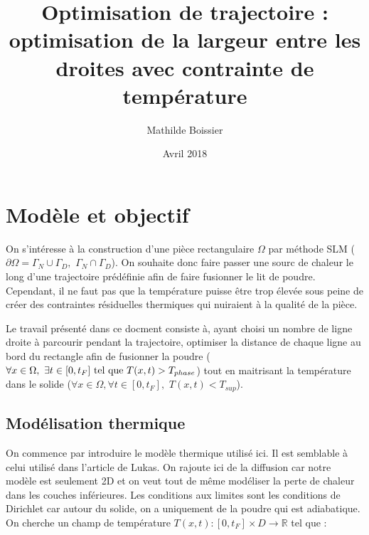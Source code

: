 \documentclass[11pt,a4paper]{article}
\begin{document}
\newcommand{\heavi}{h_{\epsilon}}
\newcommand{\heaviP}{h'_{\epsilon}}
\newcommand{\heaviPP}{h''_{\epsilon}}

\newcommand{\Math}[1]{\textcolor{red}{\textbf{#1}}}

\newcommand{\intO}{\int_{\Omega}}
\newcommand{\bigintO}{\bigint_{\Omega}}
\newcommand{\accDeuxcol}[1]{\left\{\begin{array}{ll}#1\end{array}\right.}
\newcommand{\accUnecol}[1]{\left\{\begin{array}{l}#1\end{array}\right.}

\newcommand{\stilde}{\tilde{s}}


\title{Optimisation de trajectoire : optimisation de la largeur entre les droites avec contrainte de température}
\author{Mathilde Boissier}
\date{Avril 2018}

\maketitle


\section*{Modèle et objectif}

On s'intéresse à la construction d'une pièce rectangulaire $\Omega$ par méthode SLM ($\partial\Omega=\Gamma_N\cup\Gamma_D,\,\,\Gamma_N\cap\Gamma_D$). On souhaite donc faire passer une sourc de chaleur le long d'une trajectoire prédéfinie afin de faire fusionner le lit de poudre. Cependant, il ne faut pas que la température puisse être trop élevée sous peine de créer des contraintes résiduelles thermiques qui nuiraient à la qualité de la pièce. 

\vspace{0.5cm}

Le travail présenté dans ce docment consiste à, ayant choisi un nombre de ligne droite à parcourir pendant la trajectoire, optimiser la distance de chaque ligne au bord du rectangle afin de fusionner la poudre ($\forall x\in\Omega,\,\,\exists t\in[0,t_F]\,\,\textrm{tel\,\,que}\,\,T(x,t)>T_{phase}$) tout en maitrisant la température dans le solide ($\forall x\in\Omega,\forall t\in [0,t_F],\,\,T(x,t)<T_{sup}$).

\subsection*{Modélisation thermique}
On commence par introduire le modèle thermique utilisé ici. Il est semblable à celui utilisé dans l'article de Lukas. On rajoute ici de la diffusion car notre modèle est seulement 2D et on veut tout de même modéliser la perte de chaleur dans les couches inférieures. Les conditions aux limites sont les conditions de Dirichlet car autour du solide, on a uniquement de la poudre qui est adiabatique. On cherche un champ de température $T(x,t) : [0,t_F]\times D \rightarrow \mathbb{R}$ tel que :
\end{document}
